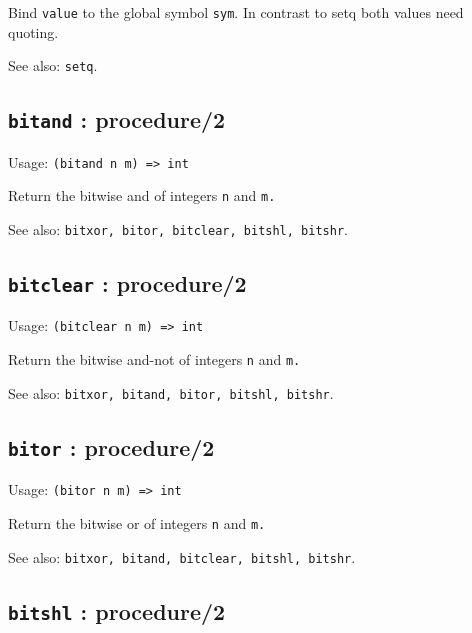 \documentclass[
]{article}
\newcommand{\passthrough}[1]{#1}
\begin{document}
Bind \passthrough{\lstinline!value!} to the global symbol
\passthrough{\lstinline!sym!}. In contrast to setq both values need
quoting.

See also: \passthrough{\lstinline!setq!}.

\hypertarget{bitand-procedure2-1}{%
\subsection{\texorpdfstring{\texttt{bitand} :
procedure/2}{bitand : procedure/2}}\label{bitand-procedure2-1}}

Usage: \passthrough{\lstinline!(bitand n m) => int!}

Return the bitwise and of integers \passthrough{\lstinline!n!} and
\passthrough{\lstinline!m.!}

See also:
\passthrough{\lstinline!bitxor, bitor, bitclear, bitshl, bitshr!}.

\hypertarget{bitclear-procedure2-1}{%
\subsection{\texorpdfstring{\texttt{bitclear} :
procedure/2}{bitclear : procedure/2}}\label{bitclear-procedure2-1}}

Usage: \passthrough{\lstinline!(bitclear n m) => int!}

Return the bitwise and-not of integers \passthrough{\lstinline!n!} and
\passthrough{\lstinline!m.!}

See also:
\passthrough{\lstinline!bitxor, bitand, bitor, bitshl, bitshr!}.

\hypertarget{bitor-procedure2-1}{%
\subsection{\texorpdfstring{\texttt{bitor} :
procedure/2}{bitor : procedure/2}}\label{bitor-procedure2-1}}

Usage: \passthrough{\lstinline!(bitor n m) => int!}

Return the bitwise or of integers \passthrough{\lstinline!n!} and
\passthrough{\lstinline!m.!}

See also:
\passthrough{\lstinline!bitxor, bitand, bitclear, bitshl, bitshr!}.

\hypertarget{bitshl-procedure2-1}{%
\subsection{\texorpdfstring{\texttt{bitshl} :
procedure/2}{bitshl : procedure/2}}\label{bitshl-procedure2-1}}
\end{document}
